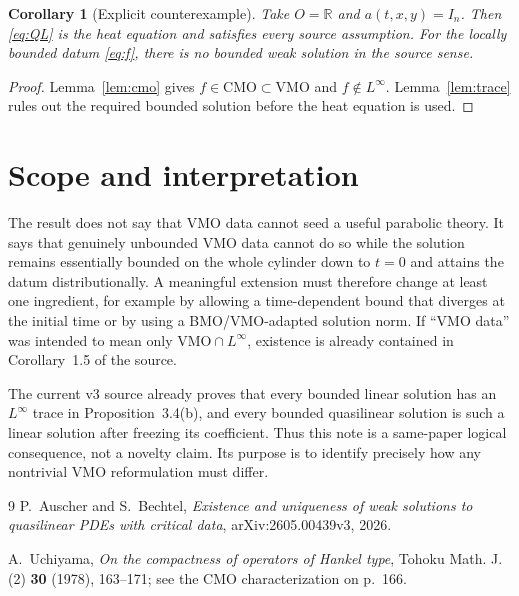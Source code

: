 \documentclass[11pt]{article}
\newtheorem{corollary}[theorem]{Corollary}
\newcommand{\R}{\mathbb R}
\newcommand{\VMO}{\mathrm{VMO}}
\newcommand{\CMO}{\mathrm{CMO}}
\begin{document}
\begin{corollary}[Explicit counterexample]\label{cor:counterexample}
Take $O=\R$ and $a(t,x,y)=I_n$.  Then \eqref{eq:QL} is the heat equation
and satisfies every source assumption.  For the locally bounded datum
\eqref{eq:f}, there is no bounded weak solution in the source sense.
\end{corollary}

\begin{proof}
Lemma~\ref{lem:cmo} gives $f\in\CMO\subset\VMO$ and
$f\notin L^\infty$.  Lemma~\ref{lem:trace} rules out the required bounded
solution before the heat equation is used.
\end{proof}

\section{Scope and interpretation}

The result does not say that VMO data cannot seed a useful parabolic
theory.  It says that genuinely unbounded VMO data cannot do so while the
solution remains essentially bounded on the whole cylinder down to
$t=0$ and attains the datum distributionally.  A meaningful extension
must therefore change at least one ingredient, for example by allowing a
time-dependent bound that diverges at the initial time or by using a
BMO/VMO-adapted solution norm.  If ``VMO data'' was intended to mean only
$\VMO\cap L^\infty$, existence is already contained in Corollary~1.5 of
the source.

The current v3 source already proves that every bounded linear solution has
an $L^\infty$ trace in Proposition~3.4(b), and every bounded quasilinear
solution is such a linear solution after freezing its coefficient. Thus this
note is a same-paper logical consequence, not a novelty claim. Its purpose is
to identify precisely how any nontrivial VMO reformulation must differ.

\begin{thebibliography}{9}
P.~Auscher and S.~Bechtel,
\emph{Existence and uniqueness of weak solutions to quasilinear PDEs with
critical data}, arXiv:2605.00439v3, 2026.

A.~Uchiyama,
\emph{On the compactness of operators of Hankel type},
Tohoku Math. J. (2) \textbf{30} (1978), 163--171; see the CMO
characterization on p.~166.
\end{thebibliography}
\end{document}
